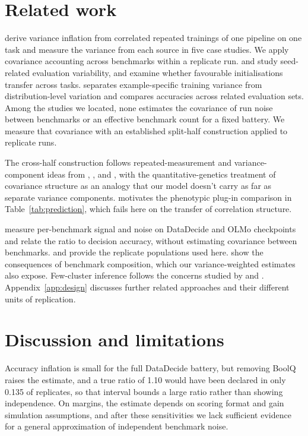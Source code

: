 \documentclass{article}
\begin{document}
\section{Related work}
\citet{bouthillier2021} derive variance inflation from correlated repeated trainings of one pipeline on one task and measure the variance from each source in five case studies. We apply covariance accounting across benchmarks within a replicate run. \citet{reimers2017} and \citet{madaan2024} study seed-related evaluation variability, and \citet{dodge2020} examine whether favourable initialisations transfer across tasks. \citet{jordan2024} separates example-specific training variance from distribution-level variation and compares accuracies across related evaluation sets. Among the studies we located, none estimates the covariance of run noise between benchmarks or an effective benchmark count for a fixed battery. We measure that covariance with an established split-half construction applied to replicate runs.

The cross-half construction follows repeated-measurement and variance-component ideas from \citet{spearman1904}, \citet{cronbach1951}, and \citet{searle1992}, with the quantitative-genetics treatment of covariance structure \citep{martin1977} as an analogy that our model doesn't carry as far as separate variance components. \citet{cheverud1988} motivates the phenotypic plug-in comparison in Table~\ref{tab:prediction}, which fails here on the transfer of correlation structure.

\citet{heineman2025} measure per-benchmark signal and noise on DataDecide and OLMo checkpoints and relate the ratio to decision accuracy, without estimating covariance between benchmarks. \citet{magnusson2025} and \citet{vanderwal2025} provide the replicate populations used here. \citet{dehghani2021} show the consequences of benchmark composition, which our variance-weighted estimates also expose. Few-cluster inference follows the concerns studied by \citet{cameron2008} and \citet{mackinnon2017}. Appendix~\ref{app:design} discusses further related approaches and their different units of replication.

\section{Discussion and limitations}
Accuracy inflation is small for the full DataDecide battery, but removing BoolQ raises the estimate, and a true ratio of 1.10 would have been declared in only 0.135 of replicates, so that interval bounds a large ratio rather than showing independence. On margins, the estimate depends on scoring format and gain simulation assumptions, and after these sensitivities we lack sufficient evidence for a general approximation of independent benchmark noise.
\end{document}
